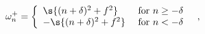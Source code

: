\begin{equation}
\omega^+_{n} = \left\{ \begin{array}{ll} 
\s{(n + \delta)^2+f^2} & \mbox{ for } n \geq -\delta \\
-\s{(n + \delta)^2+f^2} & \mbox{ for } n < -\delta 
\end{array} \right.\ \ ,
\end{equation}

